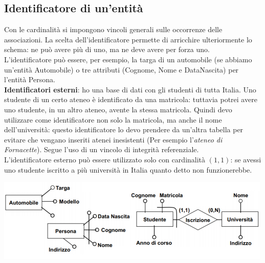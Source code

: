 \subsection{Identificatore di un'entità}
Con le cardinalità si impongono vincoli generali sulle occorrenze delle associazioni. La scelta dell'identificatore permette di arricchire ulteriormente lo schema: ne può avere più di uno, ma ne deve avere per forza uno.\\L'identificatore può essere, per esempio, la targa di un automobile (se abbiamo un'entità Automobile) o tre attributi (Cognome, Nome e DataNascita) per l'entità Persona.\\

\noindent \textbf{Identificatori esterni}: ho una base di dati con gli studenti di tutta Italia. Uno studente di un certo ateneo è identificato da una matricola: tuttavia potrei avere uno studente, in un altro ateneo, avente la stessa matricola. Quindi devo utilizzare come identificatore non solo la matricola, ma anche il nome dell'università: questo identificatore lo devo prendere da un'altra tabella per evitare che vengano inseriti atenei inesistenti (Per esempio l'\emph{ateneo di Fornacette}). Segue l'uso di un vincolo di integrità referenziale.\\
L'identificatore esterno può essere utilizzato solo con cardinalità $(1,1)$: se avessi uno studente iscritto a più università in Italia quanto detto non funzionerebbe.
\begin{center}\includegraphics{images/19.PNG}\end{center}

